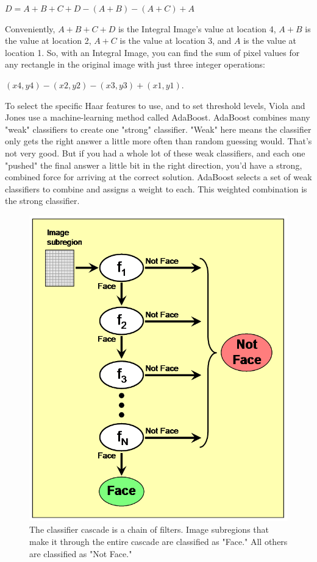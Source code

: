 \documentclass[12pt]{report}			%
\begin{document}
\begin{center}
  $D = A+B+C+D -  (A+B) -  (A+C) + A$
\end{center}
Conveniently, $A+B+C+D$ is the Integral Image's value at location 4, $A+B$ is the value at location 2, $A+C$ is the value at location 3, and $A$ is the value at location 1. So, with an Integral Image, you can find the sum of pixel values for any rectangle in the original image with just three integer operations:
\begin{center}
\(
\left(x4, y4\right) - \left(x2, y2\right) - \left(x3, y3\right) + \left(x1, y1\right)
\).
\end{center}
To select the specific Haar features to use, and to set threshold levels, Viola and Jones use a machine-learning method called AdaBoost. AdaBoost combines many "weak" classifiers to create one "strong" classifier. "Weak" here means the classifier only gets the right answer a little more often than random guessing would. That's not very good. But if you had a whole lot of these weak classifiers, and each one "pushed" the final answer a little bit in the right direction, you'd have a strong, combined force for arriving at the correct solution. AdaBoost selects a set of weak classifiers to combine and assigns a weight to each. This weighted combination is the strong classifier.\\
\begin{figure}[h]
	\centering
	\includegraphics[scale=0.4]{img/fd4.png}
	\caption{\small The classifier cascade is a chain of filters. Image subregions that make it through the entire cascade are classified as "Face." All others are classified as "Not Face."}
	\label{fig:fd3}
\end{figure}
\end{document}

